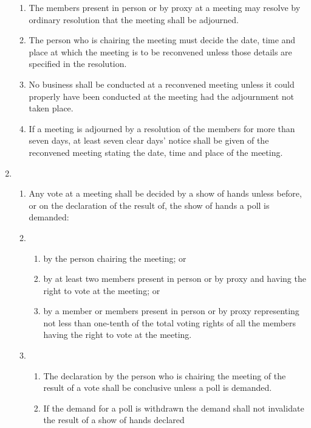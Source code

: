 \documentclass{article}
\begin{document}
\begin{enumerate}[label=\arabic*]
\begin{enumerate}[label=(\arabic*)]
        \item The members present in person or by proxy at a meeting
        may resolve by ordinary resolution that the meeting shall
        be adjourned.
        \item The person who is chairing the meeting must decide the date,
        time and place at which the meeting is to be reconvened unless
        those details are specified in the resolution.
        \item No business shall be conducted at a reconvened meeting unless
        it could properly have been conducted at the meeting had the
        adjournment not taken place.
        \item If a meeting is adjourned by a resolution of the members for
        more than seven days, at least seven clear days' notice shall
        be given of the reconvened meeting stating the date, time and
        place of the meeting.
    \end{enumerate}
    \item \begin{enumerate}[label=(\arabic*)]
        \item Any vote at a meeting shall be decided by a show of hands
        unless before, or on the declaration of the result of, the show of
        hands a poll is demanded:
        \item \begin{enumerate}[label=(\alph*)]
            \item by the person chairing the meeting; or
            \item by at least two members present in person or by proxy
            and having the right to vote at the meeting; or
            \item by a member or members present in person or by proxy
            representing not less than one-tenth of the total voting
            rights of all the members having the right to vote at
            the meeting.
        \end{enumerate}
        \item \begin{enumerate}[label=(\alph*)]
            \item  The declaration by the person who is chairing the
            meeting of the result of a vote shall be conclusive unless
            a poll is demanded.
            \item If the demand for a poll is withdrawn the demand shall
            not invalidate the result of a show of hands declared

\end{enumerate}
\end{enumerate}
\end{enumerate}
\end{document}
